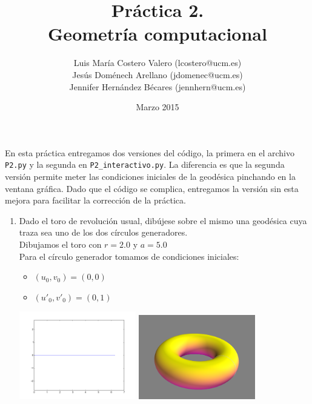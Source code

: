 \documentclass[12pt,a4paper]{article}
\title{Práctica 2. \\ Geometría computacional}
\author{Luis María Costero Valero (lcostero@ucm.es)\\ Jesús Doménech
  Arellano (jdomenec@ucm.es) \\ Jennifer Hernández Bécares (jennhern@ucm.es)}
\date{Marzo 2015}
\begin{document}
\maketitle
\decimalpoint

En esta práctica entregamos dos versiones del código, la primera en el
archivo \texttt{P2.py} y la segunda en \texttt{P2\_interactivo.py}. La diferencia es que la
segunda versión permite meter las condiciones iniciales de la
geodésica pinchando en la ventana gráfica. Dado que el código se complica,
entregamos la versión sin esta mejora para facilitar la corrección de
la práctica.

\begin{enumerate}
\item Dado el toro de revolución usual, dibújese sobre el mismo una
  geodésica cuya traza sea uno de los dos círculos generadores.\\
  Dibujamos el toro con $r = 2.0$ y $a = 5.0$ \\
  Para el círculo generador tomamos de condiciones iniciales:
  \begin{itemize}
  \item $(u_0, v_0) = (0, 0)$
  \item $(u'_0, v'_0) = (0, 1)$
  \end{itemize}

  \begin{center}
    \includegraphics[width=0.4\textwidth]{./img/circulo1_trace.png}
    \includegraphics[width=0.4\textwidth]{./img/circulo1_surface.png}
  \end{center}


\end{enumerate}
\end{document}
